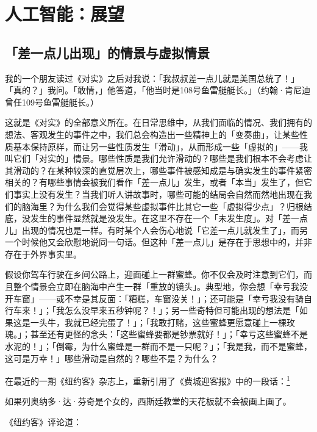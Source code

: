 \documentclass[
  12pt,
  twoside,
  openright,
  oldfontcommands,
]{memoir}
\newenvironment{fsquote}{%
  \begin{mdframed}[style=gebquote]\kaitifamily\small%
}{%
  \end{mdframed}%
}
\begin{document}
\label{Chapter19.xhtml}{}

\chapter{人工智能：展望}

\section{「差一点儿出现」的情景与虚拟情景}

我的一个朋友读过《对实》之后对我说：「我叔叔差一点儿就是美国总统了！」\,「真的？」我问。「敢情，」他答道，「他当时是108号鱼雷艇艇长。」（约翰·肯尼迪曾任109号鱼雷艇艇长。）

这就是《对实》的全部意义所在。在日常思维中，从我们面临的情况、我们拥有的想法、客观发生的事件之中，我们总会构造出一些精神上的「变奏曲」，让某些性质基本保持原样，而让另一些性质发生「滑动」，从而形成一些「虚拟的」------我叫它们「对实的」情景。哪些性质是我们允许滑动的？哪些是我们根本不会考虑让其滑动的？在某种较深的直觉层次上，哪些事件被感知成是与确实发生的事件紧密相关的？有哪些事情会被我们看作「差一点儿」发生，或者「本当」发生了，但它们事实上没有发生？当我们听人讲故事时，哪些可能的结局会自然而然地出现在我们的脑海里？为什么我们会觉得某些虚拟事件比其它一些「虚拟得少点」？归根结底，没发生的事件显然就是没发生。在这里不存在一个「未发生度」。对「差一点儿」出现的情况也是一样。有时某个人会伤心地说「它差一点儿就发生了」，而另一个时候他又会欣慰地说同一句话。但这种「差一点儿」是存在于思想中的，并非存在于外界事实里。

假设你驾车行驶在乡间公路上，迎面碰上一群蜜蜂。你不仅会及时注意到它们，而且整个情景会立即在脑海中产生一群「重放的镜头」。典型地，你会想「幸亏我没开车窗」------或不幸是其反面：「糟糕，车窗没关！」；还可能是「幸亏我没有骑自行车来！」；「我怎么没早来五秒钟呢？！」；另一些奇特但可能出现的想法是「如果这是一头牛，我就已经完蛋了！」；「我敢打赌，这些蜜蜂更愿意碰上一棵玫瑰。」；甚至还有更怪的念头：「这些蜜蜂要都是钞票就好！」；「幸亏这些蜜蜂不是水泥的！」；「倒霉，为什么蜜蜂是一群而不是一只呢？」；「我是我，而不是蜜蜂，这可是万幸！」哪些滑动是自然的？哪些不是？为什么？

在最近的一期《纽约客》杂志上，重新引用了《费城迎客报》中的一段话：\hyperref[fn:Chapter19-1]{\textsuperscript{1}}

\begin{fsquote}
如果列奥纳多·达·芬奇是个女的，西斯廷教堂的天花板就不会被画上画了。
\end{fsquote}

《纽约客》评论道：
\end{document}
